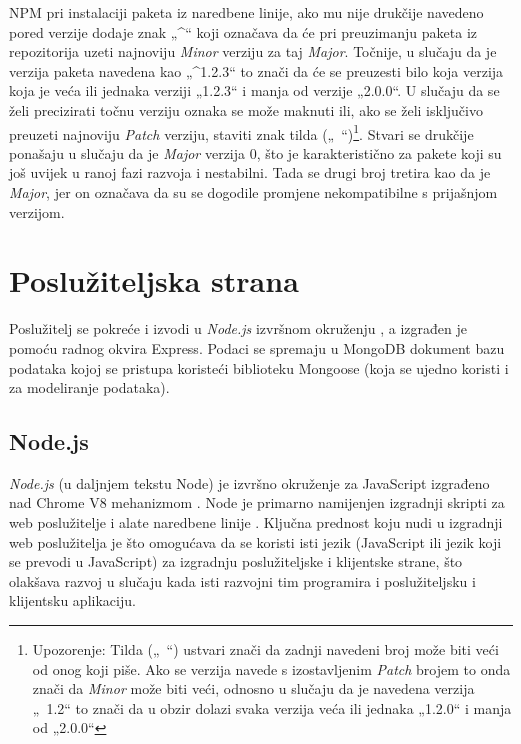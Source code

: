 \documentclass[times, utf8, diplomski, numeric]{fer}
\newcommand{\razmakp}{\vspace{18pt}}
\newcommand{\razmaks}{\vspace{10pt}}
\begin{document}
\razmakp

NPM pri instalaciji paketa iz naredbene linije, ako mu nije drukčije navedeno pored verzije dodaje znak „\string^“ koji označava da će pri preuzimanju paketa iz repozitorija uzeti najnoviju \emph{Minor} verziju za taj \emph{Major}.
Točnije, u slučaju da je verzija paketa navedena kao „\string^1.2.3“ to znači da će se preuzesti bilo koja verzija koja je veća ili jednaka verziji „1.2.3“ i manja od verzije „2.0.0“.
U slučaju da se želi precizirati točnu verziju oznaka se može maknuti ili, ako se želi isključivo preuzeti najnoviju \emph{Patch} verziju, staviti znak tilda („\string~“)\footnote{
    Upozorenje: Tilda („\string~“) ustvari znači da zadnji navedeni broj može biti veći od onog koji piše. Ako se verzija navede s izostavljenim \emph{Patch} brojem to onda znači da \emph{Minor} može biti veći, odnosno u slučaju da je navedena verzija „\string~1.2“ to znači da u obzir dolazi svaka verzija veća ili jednaka „1.2.0“ i manja od „2.0.0“
}.
Stvari se drukčije ponašaju u slučaju da je \emph{Major} verzija 0, što je karakteristično za pakete koji su još uvijek u ranoj fazi razvoja i nestabilni.
Tada se drugi broj tretira kao da je \emph{Major}, jer on označava da su se dogodile promjene nekompatibilne s prijašnjom verzijom\citep{npm_docs}.


\newpage
\section{Poslužiteljska strana}

Poslužitelj se pokreće i izvodi u \emph{Node.js} izvršnom okruženju , a izgrađen je pomoću radnog okvira  Express.
Podaci se spremaju u MongoDB dokument bazu podataka  kojoj se pristupa koristeći biblioteku Mongoose (koja se ujedno koristi i za modeliranje podataka).


\razmaks
\subsection{Node.js}

\emph{Node.js} (u daljnjem tekstu Node) je izvršno okruženje za JavaScript izgrađeno nad Chrome V8 mehanizmom .
Node je primarno namijenjen izgradnji skripti za web poslužitelje i alate naredbene linije .
Ključna prednost koju nudi u izgradnji web poslužitelja je što omogućava da se koristi isti jezik (JavaScript ili jezik koji se prevodi u JavaScript) za izgradnju poslužiteljske i klijentske strane, što olakšava razvoj u slučaju kada isti razvojni tim programira i poslužiteljsku i klijentsku aplikaciju\citep{wiki_node}.
\end{document}
